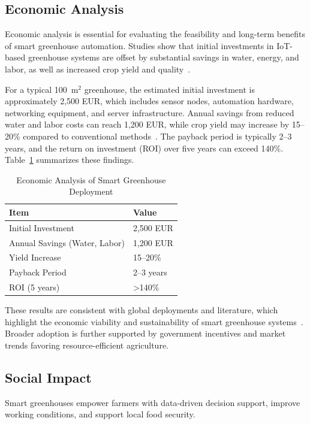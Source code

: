 \documentclass[12pt,a4paper]{article}
\begin{document}
\subsection{Economic Analysis}

Economic analysis is essential for evaluating the feasibility and long-term benefits of smart greenhouse automation. Studies show that initial investments in IoT-based greenhouse systems are offset by substantial savings in water, energy, and labor, as well as increased crop yield and quality~\cite{Netafim2020,IoTGreenhouse2022,Kamilaris2018}.

For a typical 100~m$^2$ greenhouse, the estimated initial investment is approximately 2,500 EUR, which includes sensor nodes, automation hardware, networking equipment, and server infrastructure. Annual savings from reduced water and labor costs can reach 1,200 EUR, while crop yield may increase by 15--20\% compared to conventional methods~\cite{Netafim2020,IoTGreenhouse2022}. The payback period is typically 2--3 years, and the return on investment (ROI) over five years can exceed 140\%. Table~\ref{tab:economic} summarizes these findings.

\begin{table}[H]
    \centering
    \caption{Economic Analysis of Smart Greenhouse Deployment}
    \begin{tabular}{@{}ll@{}}
    \toprule
    Item & Value \\
    \midrule
    Initial Investment & 2,500 EUR \\
    Annual Savings (Water, Labor) & 1,200 EUR \\
    Yield Increase & 15--20\% \\
    Payback Period & 2--3 years \\
    ROI (5 years) & >140\% \\
    \bottomrule
    \end{tabular}\label{tab:economic}
\end{table}

These results are consistent with global deployments and literature, which highlight the economic viability and sustainability of smart greenhouse systems~\cite{Netafim2020,IoTGreenhouse2022,Kamilaris2018}. Broader adoption is further supported by government incentives and market trends favoring resource-efficient agriculture.

\subsection{Social Impact}
Smart greenhouses empower farmers with data-driven decision support, improve working conditions, and support local food security.
\end{document}
